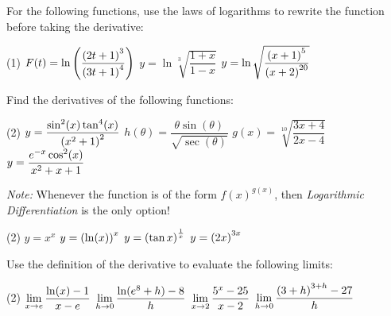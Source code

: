 \documentclass[answers]{exam}
\begin{document}
  \begin{ex*}
    For the following functions, use the laws of logarithms to rewrite the function before taking the derivative:
  \end{ex*}
  
  \noindent
  \begin{tasks}[after-item-skip=\stretch{1}, label=~](1)
    \task $F(t)=\ln\parens{\dfrac{\parens{2t+1}^3}{\parens{3t+1}^4}}$
    \task $y=\ln\sqrt[3]{\dfrac{1+x}{1-x}}$
    \task $y=\ln\sqrt{\dfrac{\parens{x+1}^5}{\parens{x+2}^{20}}}$
  \end{tasks}
  \vfill 
  
  \pagebreak
  \noindent
  \begin{ex*}
    Find the derivatives of the following functions:
  \end{ex*}
  \begin{tasks}[after-item-skip=\stretch{1}, label=~](2)
    \task $y=\dfrac{\sin^2(x)\tan^4(x)}{\parens{x^2+1}^2}$
    \task $h(\theta)=\dfrac{\theta \sin(\theta)}{\sqrt{\sec(\theta)}}$
    \task $g(x)=\sqrt[10]{\dfrac{3x+4}{2x-4}}$
    \task $y=\dfrac{e\inv[x]\cos^2(x)}{x^2+x+1}$
  \end{tasks}
  \vfill
  \pagebreak
  
  \noindent
  \textit{Note:} Whenever the function is of the form $f(x)^{g(x)}$, then \textit{Logarithmic Differentiation} is the only option!
  \begin{tasks}[after-item-skip=\stretch{1}, label=~](2)
    \task $y=x^x$
    \task $y=\parens{\ln(x)}^x$
    \task $y=\parens{\tan x}^\frac{1}{x}$
    \task $y=\parens{2x}^{3x}$
  \end{tasks}
  \vfill 
  \pagebreak
  
  \begin{ex*}
    Use the definition of the derivative to evaluate the following limits:
  \end{ex*}
  \begin{tasks}[after-item-skip=\stretch{1}, label=~](2)
    \task $\ds\lim_{x\to e} \dfrac{\ln(x)-1}{x-e}$
    \task $\ds\lim_{h\to 0} \dfrac{\ln(e^8+h)-8}{h}$
    \task $\ds\lim_{x\to 2} \dfrac{5^x-25}{x-2}$
    \task $\ds\lim_{h\to 0} \dfrac{\parens{3+h}^{3+h}-27}{h}$
  \end{tasks}
  \vfill
  \pagebreak
  
\end{document}

